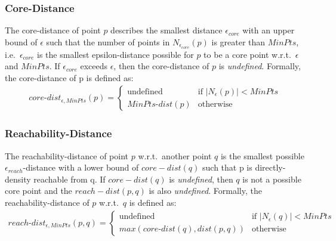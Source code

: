 \subsubsection*{Core-Distance}
The core-distance of point $p$ describes the smallest distance $\epsilon_{core}$ with an upper bound of $\epsilon$ such that the number of points in $N_{\epsilon_{core}}(p)$ is greater than $MinPts$, i.e.\ $\epsilon_{core}$ is the smallest epsilon-distance possible for $p$ to be a core point w.r.t.\ $\epsilon$ and $MinPts$. If $\epsilon_{core}$ exceeds $\epsilon$, then the core-distance of $p$ is \textit{undefined}. Formally, the core-distance of p is defined as:
\begin{align}
    core\text{-}dist_{\epsilon,MinPts}(p)=
    \begin{cases}
        \text{undefined} &\text{if } |N_\epsilon(p)| < MinPts\\
        MinPts\text{-}dist(p) &\text{otherwise}
    \end{cases}
\end{align}

\subsubsection*{Reachability-Distance}
The reachability-distance of point $p$ w.r.t.\ another point $q$ is the smallest possible $\epsilon_{reach}$-distance with a lower bound of $core-dist(q)$ such that p is directly-density reachable from q. If $core-dist(q)$ is \textit{undefined}, then $q$ is not a possible core point and the $reach-dist(p,q)$ is also \textit{undefined}.
Formally, the reachability-distance of $p$ w.r.t.\ $q$ is defined as:
\begin{align}
    reach\text{-}dist_{\epsilon,MinPts}(p,q)=
    \begin{cases}
        \text{undefined} &\text{if } |N_\epsilon(q)| < MinPts\\
        max(core\text{-}dist(q), dist(p,q)) &\text{otherwise}
    \end{cases}
\end{align}

